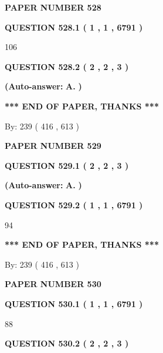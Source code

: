 \documentclass[12pt]{article}
\begin{document}
   
\newpage 
\setcounter{page}{ 
   528001 } 
   
   
 {\textbf{ \Large{ PAPER NUMBER  528  }}}
   
   
   
   
  
  
{\textbf{\large{QUESTION
528.1 
 ( 1 , 1 , 6791 )
}}}

106
  
  
{\textbf{\large{QUESTION
528.2 
 ( 2 , 2 , 3 )
}}}
 
 
{\textbf{(Auto-answer:}}
{\textbf{\large{
A.}}}
{\textbf{)}}
 
 
   
   
   
   
\vspace{1.0in} 
{\textbf{\large{ *** END OF PAPER, THANKS *** }}} 
   
   
\hspace{1.0in} By: 
 239 ( 416 ,  613 )
   
   
   
   
\newpage 
\setcounter{page}{ 
   529001 } 
   
   
 {\textbf{ \Large{ PAPER NUMBER  529  }}}
   
   
   
   
  
  
{\textbf{\large{QUESTION
529.1 
 ( 2 , 2 , 3 )
}}}
 
 
{\textbf{(Auto-answer:}}
{\textbf{\large{
A.}}}
{\textbf{)}}
 
 
  
  
{\textbf{\large{QUESTION
529.2 
 ( 1 , 1 , 6791 )
}}}

94
   
   
   
   
\vspace{1.0in} 
{\textbf{\large{ *** END OF PAPER, THANKS *** }}} 
   
   
\hspace{1.0in} By: 
 239 ( 416 ,  613 )
   
   
   
   
\newpage 
\setcounter{page}{ 
   530001 } 
   
   
 {\textbf{ \Large{ PAPER NUMBER  530  }}}
   
   
   
   
  
  
{\textbf{\large{QUESTION
530.1 
 ( 1 , 1 , 6791 )
}}}

88
  
  
{\textbf{\large{QUESTION
530.2 
 ( 2 , 2 , 3 )
}}}
 
\end{document}
